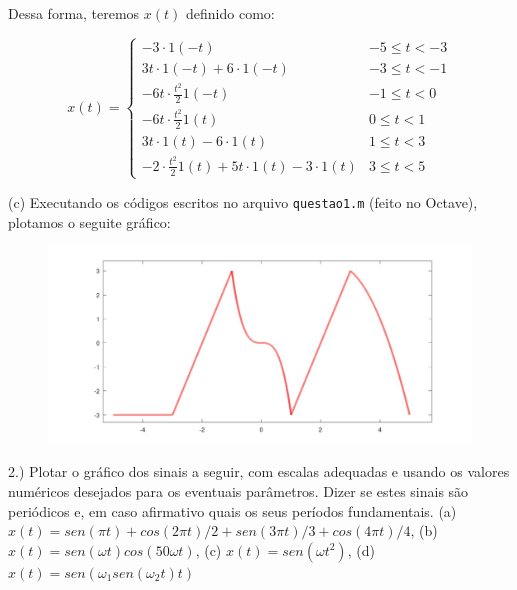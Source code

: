 \documentclass{article}
\begin{document}
Dessa forma, teremos $x(t)$ definido como:

\[ x(t) = 
\begin{cases} 
    -3 \cdot 1(-t) & -5 \leq t < -3 \\

    3t \cdot 1(-t) + 6 \cdot 1(-t) & -3 \leq t < -1 \\

    -6t \cdot \frac{t^2}{2}1(-t) & -1 \leq t < 0 \\

    -6t \cdot \frac{t^2}{2}1(t) & 0 \leq t < 1 \\

    3t \cdot 1(t) - 6 \cdot 1(t) & 1 \leq t < 3 \\

    -2 \cdot \frac{t^2}{2}1(t) + 5t \cdot 1(t) - 3 \cdot 1(t) & 3 \leq t < 5 
 \end{cases}
\]


\vspace{\baselineskip}

(c) Executando os códigos escritos no arquivo {\tt questao1.m} (feito no Octave), plotamos o seguite gráfico:

\begin{figure}[h]
    \includegraphics[scale=0.2]{plotq1c}
    \centering
\end{figure}

2.) Plotar o gráfico dos sinais a seguir, com escalas adequadas e usando os valores numéricos desejados para os eventuais parâmetros. Dizer se estes sinais são periódicos e, em caso afirmativo quais os seus períodos fundamentais.
(a) $x(t) = sen(\pi t) + cos(2 \pi t) / 2 + sen(3 \pi t) / 3 + cos(4 \pi t) / 4$,
(b) $x(t) = sen(\omega t)cos(50\omega t)$,
(c) $x(t) = sen(\omega t^2)$,
(d) $x(t) = sen(\omega_{1}sen(\omega_{2}t)t)$

\vspace{\baselineskip}
\end{document}
